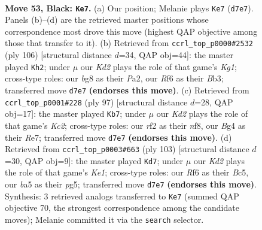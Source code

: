 \documentclass[11pt]{article}
\begin{document}
\clearpage

\begin{figure}[p]\centering
\begin{subfigure}{0.46\textwidth}\centering
\resizebox{\linewidth}{!}{%
\newchessgame
\chessboard[
  setfen={6B1/3k4/5r2/B7/P5bp/1PK2p2/5R2/6N1 b - - 1 53},
  showmover=false,
  pgfstyle=straightmove, color=movearrow, markmove={d7-e7}
]}
\caption{}
\end{subfigure}\hfill
\begin{subfigure}{0.46\textwidth}\centering
\resizebox{\linewidth}{!}{%
\newchessgame
\chessboard[
  setfen={8/3b4/3r4/1p1P2k1/3R4/1B3P1p/P7/6K1 w - - 0 54},
  showmover=false,
  pgfstyle=straightmove, color=movearrow, markmove={g1-h2}
]}
\caption{}
\end{subfigure}
\\[4pt]
\begin{subfigure}{0.46\textwidth}\centering
\resizebox{\linewidth}{!}{%
\newchessgame
\chessboard[
  setfen={5N2/2k1r3/R3p3/6bB/1P2b1P1/1K6/1P6/8 b - - 2 49},
  showmover=false,
  pgfstyle=straightmove, color=movearrow, markmove={c7-b7}
]}
\caption{}
\end{subfigure}\hfill
\begin{subfigure}{0.46\textwidth}\centering
\resizebox{\linewidth}{!}{%
\newchessgame
\chessboard[
  setfen={4k3/8/R5p1/2b3P1/5B1P/p4K2/8/4r3 b - - 0 52},
  showmover=false,
  pgfstyle=straightmove, color=movearrow, markmove={e8-d7}
]}
\caption{}
\end{subfigure}
\caption{\textbf{Move 53, Black: \texttt{Ke7}.} (a) Our position; Melanie plays \texttt{Ke7} (\texttt{d7e7}). Panels (b)--(d) are the retrieved master positions whose correspondence most drove this move (highest QAP objective among those that transfer to it). (b) Retrieved from \texttt{ccrl\_top\_p0000\#2532} (ply 106) [structural distance $d$=34, QAP obj=44]: the master played \texttt{Kh2}; under $\mu$ our \emph{Kd2} plays the role of that game's \emph{Kg1}; cross-type roles: our \emph{b}g8 as their \emph{P}a2, our \emph{R}f6 as their \emph{B}b3; transferred move \texttt{d7e7} \textbf{(endorses this move)}. (c) Retrieved from \texttt{ccrl\_top\_p0001\#228} (ply 97) [structural distance $d$=28, QAP obj=17]: the master played \texttt{Kb7}; under $\mu$ our \emph{Kd2} plays the role of that game's \emph{Kc2}; cross-type roles: our \emph{r}f2 as their \emph{n}f8, our \emph{B}g4 as their \emph{R}e7; transferred move \texttt{d7e7} \textbf{(endorses this move)}. (d) Retrieved from \texttt{ccrl\_top\_p0003\#663} (ply 103) [structural distance $d$=30, QAP obj=9]: the master played \texttt{Kd7}; under $\mu$ our \emph{Kd2} plays the role of that game's \emph{Ke1}; cross-type roles: our \emph{R}f6 as their \emph{B}c5, our \emph{b}a5 as their \emph{p}g5; transferred move \texttt{d7e7} \textbf{(endorses this move)}. Synthesis: 3 retrieved analogs transferred to \texttt{Ke7} (summed QAP objective 70, the strongest correspondence among the candidate moves); Melanie committed it via the \texttt{search} selector.}
\label{fig:thought-m105}
\end{figure}
\end{document}
